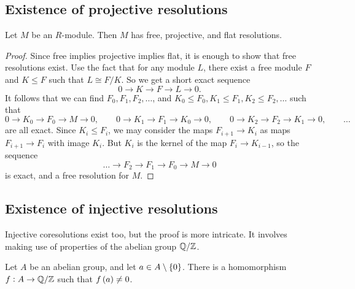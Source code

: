 \subsection{Existence of projective resolutions}

\begin{proposition}
Let $ M $ be an $ R $-module. Then $ M $ has free, projective, and flat resolutions.
\end{proposition}

\begin{proof}
Since free implies projective implies flat, it is enough to show that free resolutions exist. Use the fact that for any module $ L $, there exist a free module $ F $ and $ K \le F $ such that $ L \cong F / K $. So we get a short exact sequence
$$ 0 \to K \to F \to L \to 0. $$
It follows that we can find $ F_0, F_1, F_2, \dots $, and $ K_0 \le F_0, K_1 \le F_1, K_2 \le F_2, \dots $ such that
$$ 0 \to K_0 \to F_0 \to M \to 0, \qquad 0 \to K_1 \to F_1 \to K_0 \to 0, \qquad 0 \to K_2 \to F_2 \to K_1 \to 0, \qquad \dots $$
are all exact. Since $ K_i \le F_i $, we may consider the maps $ F_{i + 1} \to K_i $ as maps $ F_{i + 1} \to F_i $ with image $ K_i $. But $ K_i $ is the kernel of the map $ F_i \to K_{i - 1} $, so the sequence
$$ \dots \to F_2 \to F_1 \to F_0 \to M \to 0 $$
is exact, and a free resolution for $ M $.
\end{proof}

\subsection{Existence of injective resolutions}

Injective coresolutions exist too, but the proof is more intricate. It involves making use of properties of the abelian group $ \mathbb{Q} / \mathbb{Z} $.

\begin{proposition}
Let $ A $ be an abelian group, and let $ a \in A \setminus \cbr{0} $. There is a homomorphism $ f : A \to \mathbb{Q} / \mathbb{Z} $ such that $ f\br{a} \ne 0 $.
\end{proposition}

